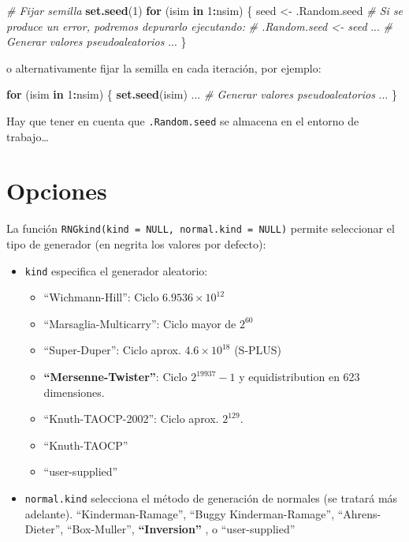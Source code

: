 \documentclass[
]{book}
\newenvironment{Shaded}{\begin{snugshade}}{\end{snugshade}}
\newcommand{\CommentTok}[1]{\textcolor[rgb]{0.56,0.35,0.01}{\textit{#1}}}
\newcommand{\ControlFlowTok}[1]{\textcolor[rgb]{0.13,0.29,0.53}{\textbf{#1}}}
\newcommand{\DecValTok}[1]{\textcolor[rgb]{0.00,0.00,0.81}{#1}}
\newcommand{\KeywordTok}[1]{\textcolor[rgb]{0.13,0.29,0.53}{\textbf{#1}}}
\newcommand{\NormalTok}[1]{#1}
\newcommand{\OperatorTok}[1]{\textcolor[rgb]{0.81,0.36,0.00}{\textbf{#1}}}
\newcommand{\StringTok}[1]{\textcolor[rgb]{0.31,0.60,0.02}{#1}}
\theoremstyle{break}
\theoremstyle{definition}
\theoremstyle{definition}
\theoremstyle{definition}
\theoremstyle{remark}
\begin{document}
\begin{Shaded}
\begin{Highlighting}[]
\CommentTok{# Fijar semilla}
\KeywordTok{set.seed}\NormalTok{(}\DecValTok{1}\NormalTok{)}
\ControlFlowTok{for}\NormalTok{ (isim }\ControlFlowTok{in} \DecValTok{1}\OperatorTok{:}\NormalTok{nsim) \{}
\NormalTok{  seed <-}\StringTok{ }\NormalTok{.Random.seed}
  \CommentTok{# Si se produce un error, podremos depurarlo ejecutando:}
  \CommentTok{#  .Random.seed <- seed}
\NormalTok{  ...}
  \CommentTok{# Generar valores pseudoaleatorios}
\NormalTok{  ...}
\NormalTok{\}}
\end{Highlighting}
\end{Shaded}

o alternativamente fijar la semilla en cada iteración, por ejemplo:

\begin{Shaded}
\begin{Highlighting}[]
\ControlFlowTok{for}\NormalTok{ (isim }\ControlFlowTok{in} \DecValTok{1}\OperatorTok{:}\NormalTok{nsim) \{}
  \KeywordTok{set.seed}\NormalTok{(isim)}
\NormalTok{  ...}
  \CommentTok{# Generar valores pseudoaleatorios}
\NormalTok{  ...}
\NormalTok{\}}
\end{Highlighting}
\end{Shaded}

Hay que tener en cuenta que \texttt{.Random.seed} se almacena en el entorno de trabajo\ldots{}

\hypertarget{opciones}{%
\section{Opciones}\label{opciones}}

La función \texttt{RNGkind(kind\ =\ NULL,\ normal.kind\ =\ NULL)} permite
seleccionar el tipo de generador (en negrita los valores por defecto):

\begin{itemize}
\item
  \texttt{kind} especifica el generador aleatorio:

  \begin{itemize}
  \item
    ``Wichmann-Hill'': Ciclo \(6.9536\times10^{12}\)
  \item
    ``Marsaglia-Multicarry'': Ciclo mayor de \(2^{60}\)
  \item
    ``Super-Duper'': Ciclo aprox. \(4.6\times10^{18}\) (S-PLUS)
  \item
    \textbf{``Mersenne-Twister''}: Ciclo \(2^{19937}-1\) y equidistribution
    en 623 dimensiones.
  \item
    ``Knuth-TAOCP-2002'': Ciclo aprox. \(2^{129}\).
  \item
    ``Knuth-TAOCP''
  \item
    ``user-supplied''
  \end{itemize}
\item
  \texttt{normal.kind} selecciona el método de generación de normales
  (se tratará más adelante).
  ``Kinderman-Ramage'', ``Buggy Kinderman-Ramage'',
  ``Ahrens-Dieter'', ``Box-Muller'', \textbf{``Inversion''} , o ``user-supplied''
\end{itemize}
\end{document}
